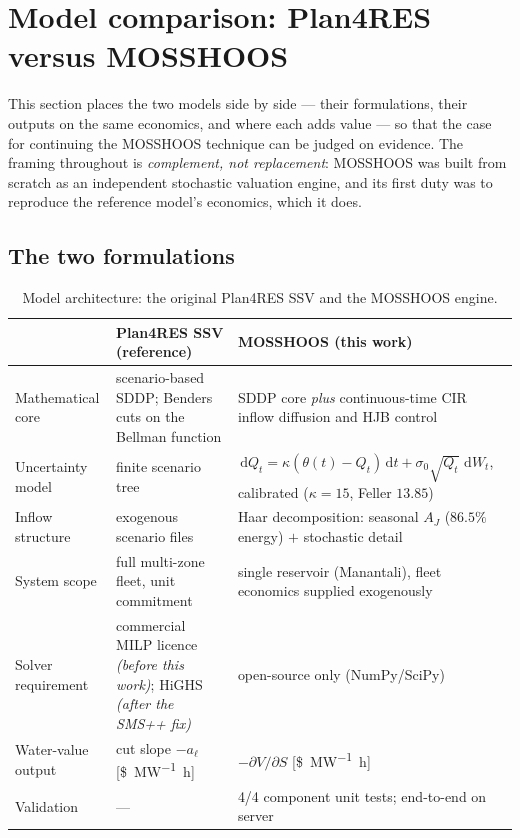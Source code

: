 \documentclass[12pt,a4paper]{article}
\newcommand{\dif}{\,\mathrm{d}}
\begin{document}
\section{Model comparison: Plan4RES versus MOSSHOOS}
\label{sec:modelcomp}

This section places the two models side by side --- their formulations, their
outputs on the same economics, and where each adds value --- so that the case
for continuing the MOSSHOOS technique can be judged on evidence. The framing
throughout is \emph{complement, not replacement}: MOSSHOOS was built from
scratch as an independent stochastic valuation engine, and its first duty was to
reproduce the reference model's economics, which it does.

\subsection{The two formulations}

\begin{table}[h]\centering
\caption{Model architecture: the original Plan4RES SSV and the MOSSHOOS engine.}
\label{tab:arch}
\small
\begin{tabularx}{\textwidth}{p{}XX}
\toprule
& \textbf{Plan4RES SSV (reference)} & \textbf{MOSSHOOS (this work)} \\
\midrule
Mathematical core & scenario-based SDDP; Benders cuts on the Bellman function &
SDDP core \emph{plus} continuous-time CIR inflow diffusion and HJB control \\
Uncertainty model & finite scenario tree & $\dif Q_t=\kappa(\theta(t){-}Q_t)\dif
t+\sigma_0\sqrt{Q_t}\,\dif W_t$, calibrated ($\kappa{=}15$, Feller $13.85$) \\
Inflow structure & exogenous scenario files & Haar decomposition: seasonal
$A_J$ ($86.5\%$ energy) $+$ stochastic detail \\
System scope & full multi-zone fleet, unit commitment & single reservoir
(Manantali), fleet economics supplied exogenously \\
Solver requirement & commercial MILP licence \emph{(before this work)};
HiGHS \emph{(after the SMS++ fix)} & open-source only (NumPy/SciPy) \\
Water-value output & cut slope $-a_\ell$ [\si{\$\per\mega\watt\hour}] &
$-\partial V/\partial S$ [\si{\$\per\mega\watt\hour}] \\
Validation & --- & 4/4 component unit tests; end-to-end on server \\
\bottomrule
\end{tabularx}
\end{table}
\end{document}

